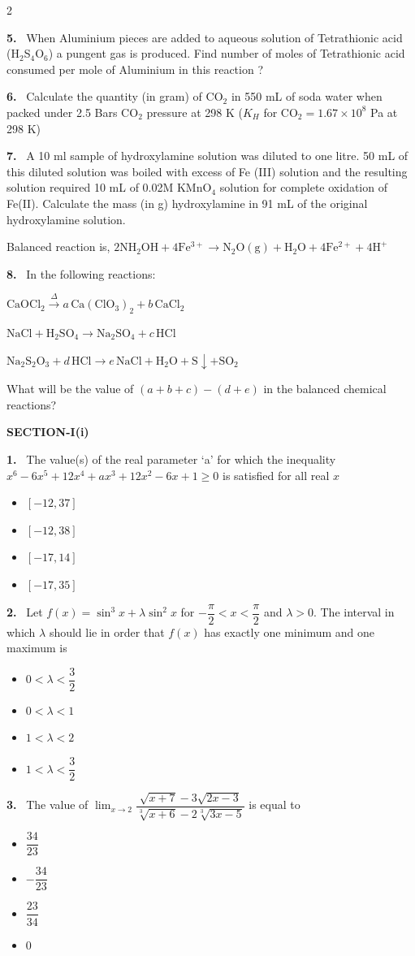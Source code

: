 \documentclass[10pt]{extarticle}
\newcommand{\partsec}[2]{\par\medskip\noindent{\large\bfseries PART-#1: #2}\par\smallskip}
\newcommand{\sect}[1]{\par\smallskip\noindent\textbf{#1}\par}
\newcommand{\qn}[1]{\par\smallskip\noindent\textbf{#1.}~}
\newenvironment{qoptions}{\begin{itemize}[leftmargin=1.8em,itemsep=1pt,topsep=2pt,label={}]}{\end{itemize}}
\newcommand{\opt}[2]{\item[(#1)] #2}
\begin{document}
\begin{multicols}{2}
\qn{5} When Aluminium pieces are added to aqueous solution of Tetrathionic acid (H$_2$S$_4$O$_6$) a pungent gas is produced. Find number of moles of Tetrathionic acid consumed per mole of Aluminium in this reaction ?

\qn{6} Calculate the quantity (in gram) of CO$_2$ in 550 mL of soda water when packed under 2.5 Bars CO$_2$ pressure at 298 K ($K_H$ for CO$_2=1.67\times10^{8}$ Pa at 298 K)

\qn{7} A 10 ml sample of hydroxylamine solution was diluted to one litre. 50 mL of this diluted solution was boiled with excess of Fe (III) solution and the resulting solution required 10 mL of 0.02M KMnO$_4$ solution for complete oxidation of Fe(II). Calculate the mass (in g) hydroxylamine in 91 mL of the original hydroxylamine solution.

Balanced reaction is, $2\mathrm{NH_2OH}+4\mathrm{Fe^{3+}}\to \mathrm{N_2O(g)}+\mathrm{H_2O}+4\mathrm{Fe^{2+}}+4\mathrm{H^+}$

\qn{8} In the following reactions:

$\mathrm{CaOCl_2}\xrightarrow{\Delta}a\,\mathrm{Ca(ClO_3)_2}+b\,\mathrm{CaCl_2}$

$\mathrm{NaCl+H_2SO_4\to Na_2SO_4}+c\,\mathrm{HCl}$

$\mathrm{Na_2S_2O_3}+d\,\mathrm{HCl}\to e\,\mathrm{NaCl+H_2O+S\downarrow+SO_2}$

What will be the value of $(a+b+c)-(d+e)$ in the balanced chemical reactions?
\partsec{3}{MATHEMATICS}
\sect{SECTION-I(i)}
\qn{1} The value(s) of the real parameter `a' for which the inequality $x^6-6x^5+12x^4+ax^3+12x^2-6x+1\ge0$ is satisfied for all real $x$
\begin{qoptions}
\opt{A}{$[-12,37]$}
\opt{B}{$[-12,38]$}
\opt{C}{$[-17,14]$}
\opt{D}{$[-17,35]$}
\end{qoptions}

\qn{2} Let $f(x)=\sin^3x+\lambda\sin^2x$ for $-\dfrac{\pi}{2}<x<\dfrac{\pi}{2}$ and $\lambda>0$. The interval in which $\lambda$ should lie in order that $f(x)$ has exactly one minimum and one maximum is
\begin{qoptions}
\opt{A}{$0<\lambda<\dfrac{3}{2}$}
\opt{B}{$0<\lambda<1$}
\opt{C}{$1<\lambda<2$}
\opt{D}{$1<\lambda<\dfrac{3}{2}$}
\end{qoptions}

\qn{3} The value of $\displaystyle\lim_{x\to2}\dfrac{\sqrt{x+7}-3\sqrt{2x-3}}{\sqrt[3]{x+6}-2\sqrt[3]{3x-5}}$ is equal to
\begin{qoptions}
\opt{A}{$\dfrac{34}{23}$}
\opt{B}{$-\dfrac{34}{23}$}
\opt{C}{$\dfrac{23}{34}$}
\opt{D}{$0$}
\end{qoptions}


\end{multicols}
\end{document}
